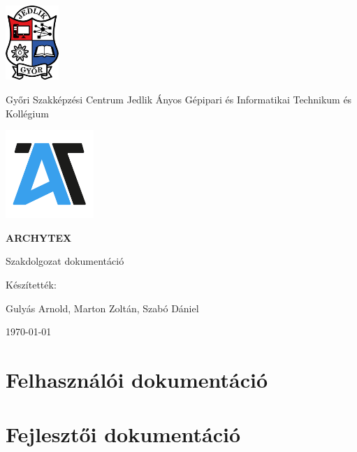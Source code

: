 \documentclass[12pt, twoside]{article}
\begin{document}
\begin{titlepage}
  \centering
  \includegraphics[width=0.15\textwidth]{images/jedlik_logo.png}\par\vspace{1cm}
  {\Large Győri Szakképzési Centrum Jedlik Ányos Gépipari és Informatikai Technikum és Kollégium\par}
  \vspace{2cm}
  \includegraphics[width=0.25\textwidth]{images/archytex_logo.png}\par\vspace{1cm}
  {\huge\sffamily\textbf{ARCHYTEX}\par}
  \vspace{1cm}
  {\Large Szakdolgozat dokumentáció\par}
  \vfill
  Készítették:\par
  Gulyás Arnold, Marton Zoltán, Szabó Dániel

  \vfill

  \vfill
  {\large \today\par}
\end{titlepage}



\tableofcontents



\part{Felhasználói dokumentáció}

\part{Fejlesztői dokumentáció}








\appendix




\end{document}
